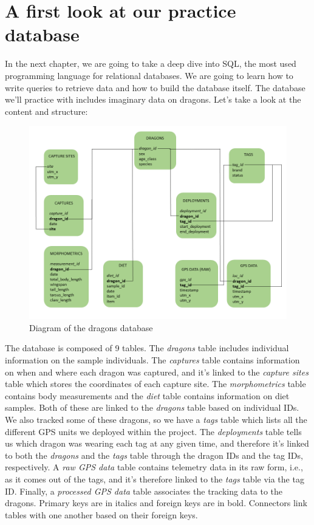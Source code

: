 \documentclass[
]{book}
\begin{document}
\hypertarget{a-first-look-at-our-practice-database}{%
\section{A first look at our practice database}\label{a-first-look-at-our-practice-database}}

In the next chapter, we are going to take a deep dive into SQL, the most used
programming language for relational databases. We are going to learn how to
write queries to retrieve data and how to build the database itself. The
database we'll practice with includes imaginary data on dragons. Let's take a
look at the content and structure:

\begin{figure}

{\centering \includegraphics[width=0.8\linewidth]{img/database_diagram} 

}

\caption{Diagram of the dragons database}\label{fig:db-diagram}
\end{figure}

The database is composed of 9 tables. The \emph{dragons} table includes individual
information on the sample individuals. The \emph{captures} table contains information
on when and where each dragon was captured, and it's linked to the \emph{capture sites}
table which stores the coordinates of each capture site. The \emph{morphometrics}
table contains body measurements and the \emph{diet} table contains information on
diet samples. Both of these are linked to the \emph{dragons} table based on
individual IDs. We also tracked some of these dragons, so we have a \emph{tags} table
which lists all the different GPS units we deployed within the project. The
\emph{deployments} table tells us which dragon was wearing each tag at any given time,
and therefore it's linked to both the \emph{dragons} and the \emph{tags} table through the
dragon IDs and the tag IDs, respectively. A \emph{raw GPS data} table contains
telemetry data in its raw form, i.e., as it comes out of the tags, and it's
therefore linked to the \emph{tags} table via the tag ID. Finally, a \emph{processed GPS data}
table associates the tracking data to the dragons. Primary keys are in italics
and foreign keys are in bold. Connectors link tables with one another based on
their foreign keys.
\end{document}
